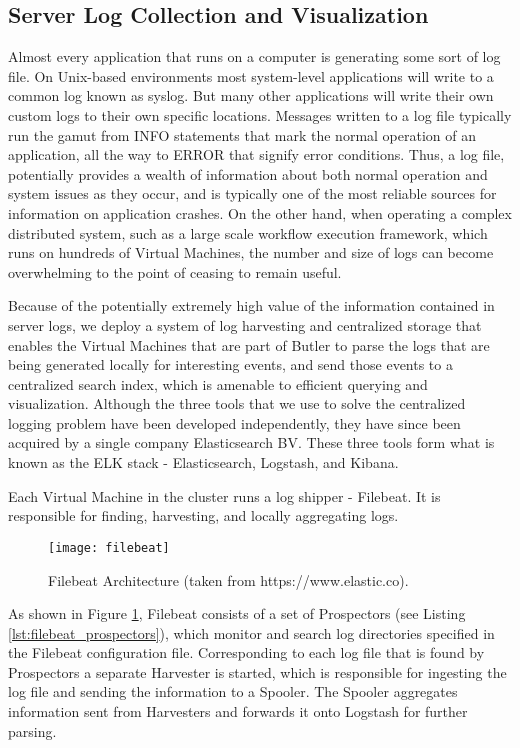 \subsection{Server Log Collection and Visualization} 
\label{sec:design_log_collection}

Almost every application that runs on a computer is generating some sort of log file. On Unix-based environments most system-level applications will write to a common log known as syslog. But many other applications will write their own custom logs to their own specific locations. Messages written to a log file typically run the gamut from INFO statements that mark the normal operation of an application, all the way to ERROR that signify error conditions. Thus, a log file, potentially provides a wealth of information about both normal operation and system issues as they occur, and is typically one of the most reliable sources for information on application crashes. On the other hand, when operating a complex distributed system, such as a large scale workflow execution framework, which runs on hundreds of Virtual Machines, the number and size of logs can become overwhelming to the point of ceasing to remain useful.  

Because of the potentially extremely high value of the information contained in server logs, we deploy a system of log harvesting and centralized storage that enables the Virtual Machines that are part of Butler to parse the logs that are being generated locally for interesting events, and send those events to a centralized search index, which is amenable to efficient querying and visualization. Although the three tools that we use to solve the centralized logging problem have been developed independently, they have since been acquired by a single company Elasticsearch BV. These three tools form what is known as the ELK stack - Elasticsearch\autocite{Elasticsearch}, Logstash\autocite{Logstash}, and Kibana\autocite{Kibana}.

Each Virtual Machine in the cluster runs a log shipper - Filebeat. It is responsible for finding, harvesting, and locally aggregating logs.

\begin{figure}[h]
\texttt{[image: filebeat]}
\centering
\caption {Filebeat Architecture (taken from https://www.elastic.co).}
\label{fig:filebeat}
\end{figure}

As shown in Figure \ref{fig:filebeat}, Filebeat consists of a set of Prospectors (see Listing \ref{lst:filebeat_prospectors}), which monitor and search log directories specified in the Filebeat configuration file. Corresponding to each log file that is found by Prospectors a separate Harvester is started, which is responsible for ingesting the log file and sending the information to a Spooler. The Spooler aggregates information sent from Harvesters and forwards it onto Logstash for further parsing.


